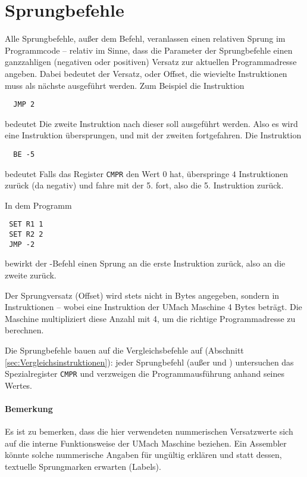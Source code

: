 \section{Sprungbefehle}
\label{sec:Sprungbefehle}

Alle Sprungbefehle, außer dem  Befehl, veranlassen einen relativen
Sprung im Programmcode -- relativ im Sinne, dass die Parameter der Sprungbefehle
einen ganzzahligen (negativen oder positiven) Versatz zur aktuellen
Programmadresse angeben. Dabei bedeutet der Versatz, oder
Offset, die wievielte Instruktionen muss als nächste ausgeführt
werden. Zum Beispiel die Instruktion
\begin{lstlisting}
  JMP 2
\end{lstlisting}
bedeutet
\glqq Die zweite Instruktion nach dieser soll ausgeführt werden\grqq. Also es
wird eine Instruktion übersprungen, und mit der zweiten fortgefahren.
Die Instruktion
\begin{lstlisting}
  BE -5
\end{lstlisting}
bedeutet \glqq Falls das Register \texttt{CMPR} den Wert $0$ hat, überspringe
$4$ Instruktionen zurück (da negativ) und fahre mit der 5. fort\grqq, also die
5. Instruktion zurück. 

In dem Programm
\begin{lstlisting}
 SET R1 1
 SET R2 2
 JMP -2
\end{lstlisting}
bewirkt der -Befehl einen Sprung an die erste Instruktion zurück,
also an die zweite zurück.

Der Sprungversatz (Offset) wird stets nicht in Bytes angegeben, sondern in
Instruktionen -- wobei eine Instruktion der UMach Maschine 4 Bytes beträgt. Die
Maschine multipliziert diese Anzahl mit 4, um die richtige Programmadresse zu
berechnen.

Die Sprungbefehle bauen auf die Vergleichsbefehle auf (Abschnitt
\ref{sec:Vergleichsinstruktionen}): jeder Sprungbefehl (außer 
und ) untersuchen das Spezialregister \texttt{CMPR} und verzweigen die
Programmausführung anhand seines Wertes.

\paragraph{Bemerkung}
Es ist zu bemerken, dass die hier verwendeten nummerischen Versatzwerte sich
auf die interne Funktionsweise der UMach Maschine beziehen. Ein Assembler
könnte solche nummerische Angaben für ungültig erklären und statt dessen,
textuelle Sprungmarken erwarten (Labels).


